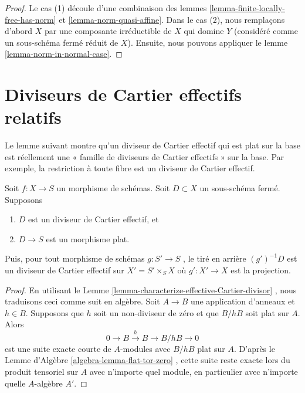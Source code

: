 \begin{proof}
Le cas (1) découle d'une combinaison des lemmes  \ref{lemma-finite-locally-free-has-norm}  et  \ref{lemma-norm-quasi-affine}. Dans
le cas (2), nous remplaçons d'abord  $X$  par une composante irréductible
de  $X$  qui domine  $Y$  (considéré comme un sous-schéma fermé
réduit de  $X$). Ensuite, nous pouvons appliquer le lemme  \ref{lemma-norm-in-normal-case}.
\end{proof}





\section{Diviseurs de Cartier effectifs relatifs}
\label{section-effective-Cartier-morphisms}

\noindent
Le lemme suivant montre qu'un diviseur de Cartier effectif qui est plat sur la
base est réellement une « famille de diviseurs de Cartier effectifs » sur la base.
Par exemple, la restriction à toute fibre est un diviseur de Cartier effectif.

\begin{lemma}
\label{lemma-relative-Cartier}
Soit  $f : X \to S$  un morphisme de schémas. Soit  $D \subset X$  un sous-schéma fermé.
Supposons
\begin{enumerate}
\item $D$  est un diviseur de Cartier effectif, et
\item $D \to S$  est un morphisme plat.
\end{enumerate}
Puis, pour tout morphisme de schémas  $g : S' \to S$ , le tiré en arrière  $(g')^{-1}D$ 
est un diviseur de Cartier effectif sur  $X' = S' \times_S X$  où  $g' : X' \to X$  est la
projection.
\end{lemma}

\begin{proof}
En utilisant le Lemme  \ref{lemma-characterize-effective-Cartier-divisor} , nous traduisons ceci comme suit en algèbre.
Soit  $A \to B$  une application d'anneaux et  $h \in B$. Supposons que
 $h$  soit un non-diviseur de zéro et que  $B/hB$  soit plat sur
 $A$. Alors
$$
0 \to B \xrightarrow{h} B \to B/hB \to 0
$$
est une suite exacte courte de  $A$-modules avec  $B/hB$  plat sur
 $A$. D'après le Lemme d'Algèbre  \ref{algebra-lemma-flat-tor-zero} , cette suite reste exacte
lors du produit tensoriel sur  $A$  avec n'importe quel module, en
particulier avec n'importe quelle  $A$-algèbre  $A'$.
\end{proof}

